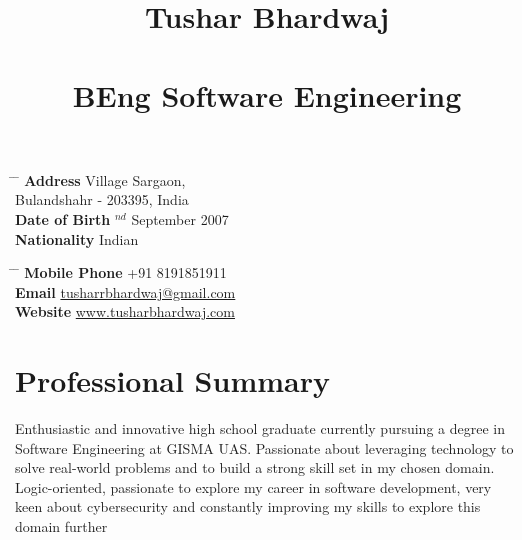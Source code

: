 \documentclass[10pt]{article} %
\begin{document}

\title{Tushar Bhardwaj \\\\\small{BEng Software Engineering}} %


\parbox{0.5\textwidth}{ %
\begin{tabbing} %
\hspace{3cm} \= \hspace{4cm} \= \kill %
{\bf Address} \> Village Sargaon,\\ %
\> Bulandshahr - 203395, India \\ %
{\bf Date of Birth} $^{nd}$ September 2007 \\ %
{\bf Nationality} \> Indian %
\end{tabbing}}
\hfill %
\parbox{0.5\textwidth}{ %
\begin{tabbing} %
\hspace{3cm} \= \hspace{4cm} \= \kill %
{\bf Mobile Phone} \> +91 8191851911 \\ %
{\bf Email} \> \href{mailto:tusharrbhardwaj@gmail.com}{\color{blue} tusharrbhardwaj@gmail.com} \\ %
{\bf Website} \> \href{tusharbhardwaj.com}{\color{blue} www.tusharbhardwaj.com} \\ %
\end{tabbing}}

\hline



\section{Professional Summary}

Enthusiastic and innovative high school graduate currently pursuing a degree in
Software Engineering at GISMA UAS. 
Passionate about leveraging technology to solve real-world problems and to build a strong skill set in my chosen domain.
Logic-oriented, passionate to explore my career in software development, very keen about cybersecurity and constantly improving my skills to explore this domain further\\
\end{document}
